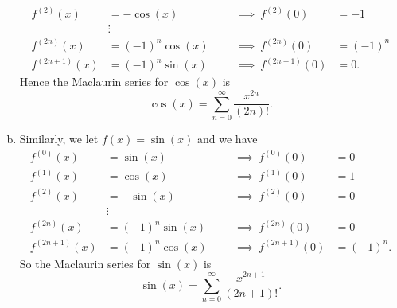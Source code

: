 \documentclass[12pt]{article} %
\begin{document}
\begin{solution}
\begin{enumerate}[(a)]
\begin{align*}
        f^{(2)}(x)&=-\cos(x) &&& \implies~ f^{(2)}(0)&=-1\\
        & \vdots \\
        f^{(2n)}(x)&=(-1)^n \cos(x)&&& \implies ~ f^{(2n)}(0)&=(-1)^n\\
        f^{(2n+1)}(x)&=(-1)^n \sin(x) &&& \implies ~f^{(2n+1)}(0)&=0.
    \end{align*}
    Hence the Maclaurin series for $\cos(x)$ is
    \[
    \cos(x) =\sum_{n=0}^\infty \frac{x^{2n}}{(2n)!}.
    \]
    \item Similarly, we let $f(x)=\sin(x)$ and we have
    \begin{align*}
        f^{(0)}(x)&=\sin(x) &&& \implies~ f^{(0)}(0)&=0\\
        f^{(1)}(x)&=\cos(x) &&& \implies~ f^{(1)}(0)&=1\\
        f^{(2)}(x)&=-\sin(x) &&& \implies~ f^{(2)}(0)&=0\\
        & \vdots \\
        f^{(2n)}(x)&=(-1)^n \sin(x)&&& \implies ~ f^{(2n)}(0)&=0\\
        f^{(2n+1)}(x)&=(-1)^n \cos(x) &&& \implies ~f^{(2n+1)}(0)&=(-1)^n.
    \end{align*}
    So the Maclaurin series for $\sin(x)$ is
    \[
    \sin(x) = \sum_{n=0}^\infty \frac{x^{2n+1}}{(2n+1)!}.
    \]
\end{enumerate}
\end{solution}
\end{document}
